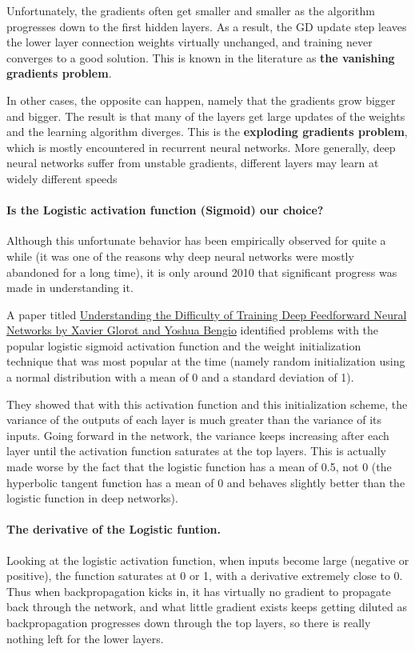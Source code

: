 \documentclass[%
oneside,                 %
final,                   %
10pt]{article}
\begin{document}
Unfortunately, the gradients often get smaller and smaller as the
algorithm progresses down to the first hidden layers. As a result, the
GD update step leaves the lower layer connection weights
virtually unchanged, and training never converges to a good
solution. This is known in the literature as 
\textbf{the vanishing gradients problem}. 

In other cases, the opposite can happen, namely that the gradients grow bigger and
bigger. The result is that many of the layers get large updates of the 
weights and the learning algorithm diverges. This is the \textbf{exploding gradients problem}, which is mostly encountered in recurrent neural networks. More generally, deep neural networks suffer from unstable gradients, different layers may learn at widely different speeds

\paragraph{Is the Logistic activation function (Sigmoid) our choice?}
Although this unfortunate behavior has been empirically observed for
quite a while (it was one of the reasons why deep neural networks were
mostly abandoned for a long time), it is only around 2010 that
significant progress was made in understanding it.

A paper titled \href{{http://proceedings.mlr.press/v9/glorot10a.html}}{Understanding the Difficulty of Training Deep
Feedforward Neural Networks by Xavier Glorot and Yoshua Bengio} identified problems with the popular logistic
sigmoid activation function and the weight initialization technique
that was most popular at the time (namely random initialization using
a normal distribution with a mean of 0 and a standard deviation of
1). 

They showed that with this activation function and this
initialization scheme, the variance of the outputs of each layer is
much greater than the variance of its inputs. Going forward in the
network, the variance keeps increasing after each layer until the
activation function saturates at the top layers. This is actually made
worse by the fact that the logistic function has a mean of 0.5, not 0
(the hyperbolic tangent function has a mean of 0 and behaves slightly
better than the logistic function in deep networks).


\paragraph{The derivative of the Logistic funtion.}
Looking at the logistic activation function, when inputs become large
(negative or positive), the function saturates at 0 or 1, with a
derivative extremely close to 0. Thus when backpropagation kicks in,
it has virtually no gradient to propagate back through the network,
and what little gradient exists keeps getting diluted as
backpropagation progresses down through the top layers, so there is
really nothing left for the lower layers.
\end{document}
